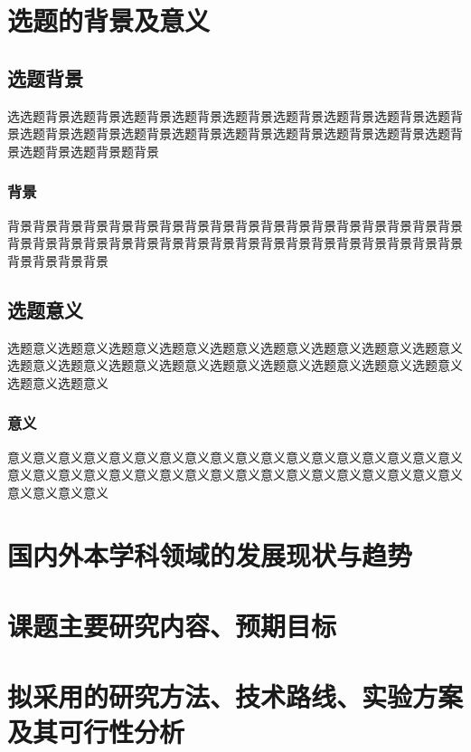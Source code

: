 \section{选题的背景及意义}

\subsection{选题背景}

选选题背景选题背景选题背景选题背景选题背景选题背景选题背景选题背景选题背景选题背景选题背景选题背景选题背景选题背景选题背景选题背景选题背景选题背景选题背景选题背景题背景

\subsubsection{背景}

背景背景背景背景背景背景背景背景背景背景背景背景背景背景背景背景背景背景背景背景背景背景背景背景背景背景背景背景背景背景背景背景背景背景背景背景背景背景背景背景

\subsection{选题意义}

选题意义选题意义选题意义选题意义选题意义选题意义选题意义选题意义选题意义选题意义选题意义选题意义选题意义选题意义选题意义选题意义选题意义选题意义选题意义选题意义

\subsubsection{意义}

意义意义意义意义意义意义意义意义意义意义意义意义意义意义意义意义意义意义意义意义意义意义意义意义意义意义意义意义意义意义意义意义意义意义意义意义意义意义意义意义

\section{国内外本学科领域的发展现状与趋势}

\section{课题主要研究内容、预期目标}

\section{拟采用的研究方法、技术路线、实验方案及其可行性分析}

